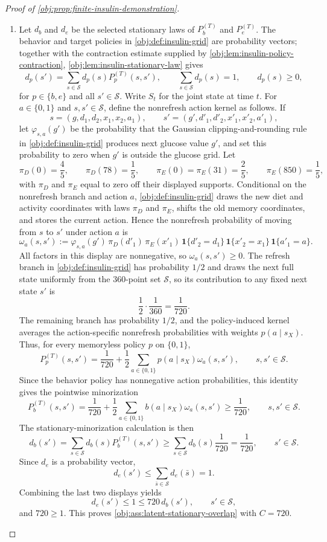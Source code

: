 \documentclass[11pt]{article}
\begin{document}
\begin{proof}[Proof of \cref{obj:prop:finite-insulin-demonstration}]
\begin{enumerate}
\item Let \(d_b\) and \(d_e\) be the selected stationary laws of \(P_b^{(T)}\) and \(P_e^{(T)}\). The behavior and target policies in \cref{obj:def:insulin-grid} are probability vectors; together with the contraction estimate supplied by \cref{obj:lem:insulin-policy-contraction}, \cref{obj:lem:insulin-stationary-law} gives
\[
d_p(s')
=
\sum_{s\in\mathcal S}d_p(s)P_p^{(T)}(s,s'),
\qquad
\sum_{s\in\mathcal S}d_p(s)=1,
\qquad
 d_p(s)\ge0,
\]
for \(p\in\{b,e\}\) and all \(s'\in\mathcal S\).
Write \(S_t\) for the joint state at time \(t\). For \(a\in\{0,1\}\) and \(s,s'\in\mathcal S\), define the nonrefresh action kernel as follows. If
\[
s=(g,d_1,d_2,x_1,x_2,a_1),
\qquad
s'=(g',d'_1,d'_2,x'_1,x'_2,a'_1),
\]
let \(\varphi_{s,a}(g')\) be the probability that the Gaussian clipping-and-rounding rule in \cref{obj:def:insulin-grid} produces next glucose value \(g'\), and set this probability to zero when \(g'\) is outside the glucose grid. Let
\[
\pi_D(0)=\frac45,
\qquad
\pi_D(78)=\frac15,
\qquad
\pi_E(0)=\pi_E(31)=\frac25,
\qquad
\pi_E(850)=\frac15,
\]
with \(\pi_D\) and \(\pi_E\) equal to zero off their displayed supports. Conditional on the nonrefresh branch and action \(a\), \cref{obj:def:insulin-grid} draws the new diet and activity coordinates with laws \(\pi_D\) and \(\pi_E\), shifts the old memory coordinates, and stores the current action. Hence the nonrefresh probability of moving from \(s\) to \(s'\) under action \(a\) is
\[
\omega_a(s,s')
:=
\varphi_{s,a}(g')\,\pi_D(d'_1)\,\pi_E(x'_1)\,
\mathbf 1\{d'_2=d_1\}\,
\mathbf 1\{x'_2=x_1\}\,
\mathbf 1\{a'_1=a\}.
\]
All factors in this display are nonnegative, so \(\omega_a(s,s')\ge0\). The refresh branch in \cref{obj:def:insulin-grid} has probability \(1/2\) and draws the next full state uniformly from the \(360\)-point set \(\mathcal S\), so its contribution to any fixed next state \(s'\) is
\[
\frac12\cdot\frac1{360}=\frac1{720}.
\]
The remaining branch has probability \(1/2\), and the policy-induced kernel averages the action-specific nonrefresh probabilities with weights \(p(a\mid s_X)\). Thus, for every memoryless policy \(p\) on \(\{0,1\}\),
\[
P_p^{(T)}(s,s')
=
\frac1{720}
+
\frac12\sum_{a\in\{0,1\}}p(a\mid s_X)\omega_a(s,s'),
\qquad s,s'\in\mathcal S .
\]
Since the behavior policy has nonnegative action probabilities, this identity gives the pointwise minorization
\[
P_b^{(T)}(s,s')
=
\frac1{720}
+\frac12\sum_{a\in\{0,1\}}b(a\mid s_X)\omega_a(s,s')
\ge
\frac1{720},
\qquad s,s'\in\mathcal S .
\]
The stationary-minorization calculation is then
\[
d_b(s')
=
\sum_{s\in\mathcal S}d_b(s)P_b^{(T)}(s,s')
\ge
\sum_{s\in\mathcal S}d_b(s)\frac1{720}
=
\frac1{720},
\qquad s'\in\mathcal S .
\]
Since \(d_e\) is a probability vector,
\[
d_e(s')\le\sum_{\bar s\in\mathcal S}d_e(\bar s)=1.
\]
Combining the last two displays yields
\[
d_e(s')\le 1\le 720\,d_b(s'),
\qquad s'\in\mathcal S,
\]
and \(720\ge1\). This proves \cref{obj:ass:latent-stationary-overlap} with \(C=720\). %


\end{enumerate}
\end{proof}
\end{document}
